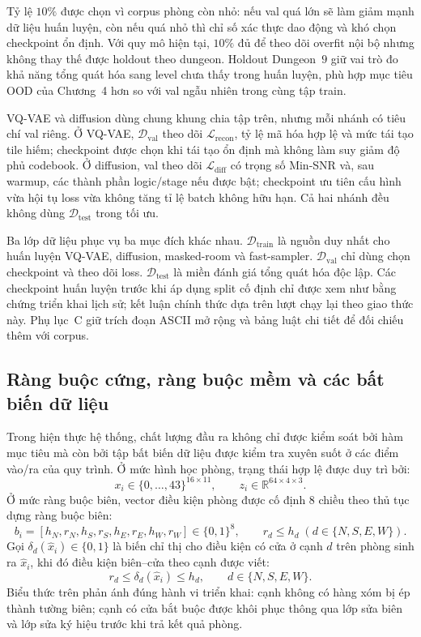 \documentclass[oneside,a4paper,12pt]{extreport}
\begin{document}
Tỷ lệ $10\%$ được chọn vì corpus phòng còn nhỏ: nếu val quá lớn sẽ làm giảm mạnh dữ liệu huấn luyện, còn nếu quá nhỏ thì chỉ số xác thực dao động và khó chọn checkpoint ổn định. Với quy mô hiện tại, $10\%$ đủ để theo dõi overfit nội bộ nhưng không thay thế được holdout theo dungeon. Holdout Dungeon~$9$ giữ vai trò đo khả năng tổng quát hóa sang level chưa thấy trong huấn luyện, phù hợp mục tiêu OOD của Chương~4 hơn so với val ngẫu nhiên trong cùng tập train.

VQ-VAE và diffusion dùng chung khung chia tập trên, nhưng mỗi nhánh có tiêu chí val riêng. Ở VQ-VAE, $\mathcal{D}_{\text{val}}$ theo dõi $\mathcal{L}_{\mathrm{recon}}$, tỷ lệ mã hóa hợp lệ và mức tái tạo tile hiếm; checkpoint được chọn khi tái tạo ổn định mà không làm suy giảm độ phủ codebook. Ở diffusion, val theo dõi $\mathcal{L}_{\mathrm{diff}}$ có trọng số Min-SNR và, sau warmup, các thành phần logic/stage nếu được bật; checkpoint ưu tiên cấu hình vừa hội tụ loss vừa không tăng tỉ lệ batch không hữu hạn. Cả hai nhánh đều không dùng $\mathcal{D}_{\text{test}}$ trong tối ưu.

Ba lớp dữ liệu phục vụ ba mục đích khác nhau. $\mathcal{D}_{\text{train}}$ là nguồn duy nhất cho huấn luyện VQ-VAE, diffusion, masked-room và fast-sampler. $\mathcal{D}_{\text{val}}$ chỉ dùng chọn checkpoint và theo dõi loss. $\mathcal{D}_{\text{test}}$ là miền đánh giá tổng quát hóa độc lập. Các checkpoint huấn luyện trước khi áp dụng split cố định chỉ được xem như bằng chứng triển khai lịch sử; kết luận chính thức dựa trên lượt chạy lại theo giao thức này. Phụ lục~C giữ trích đoạn ASCII mở rộng và bảng luật chi tiết để đối chiếu thêm với corpus.

\subsection{Ràng buộc cứng, ràng buộc mềm và các bất biến dữ liệu}
Trong hiện thực hệ thống, chất lượng đầu ra không chỉ được kiểm soát bởi hàm mục tiêu mà còn bởi tập bất biến dữ liệu được kiểm tra xuyên suốt ở các điểm vào/ra của quy trình. Ở mức hình học phòng, trạng thái hợp lệ được duy trì bởi:
\begin{equation}
x_i \in \{0,\ldots,43\}^{16\times 11},
\qquad
z_i \in \mathbb{R}^{64\times 4\times 3}.
\end{equation}
Ở mức ràng buộc biên, vector điều kiện phòng được cố định 8 chiều theo thủ tục dựng ràng buộc biên:
\begin{equation}
b_i = [h_N,r_N,h_S,r_S,h_E,r_E,h_W,r_W] \in \{0,1\}^8,
\qquad
r_d \le h_d \; (d \in \{N,S,E,W\}).
\end{equation}
Gọi $\delta_d(\hat{x}_i)\in\{0,1\}$ là biến chỉ thị cho điều kiện có cửa ở cạnh $d$ trên phòng sinh ra $\hat{x}_i$, khi đó điều kiện biên--cửa theo cạnh được viết:
\begin{equation}
r_d \le \delta_d(\hat{x}_i) \le h_d,
\qquad d\in\{N,S,E,W\}.
\end{equation}
Biểu thức trên phản ánh đúng hành vi triển khai: cạnh không có hàng xóm bị ép thành tường biên; cạnh có cửa bắt buộc được khôi phục thông qua lớp sửa biên và lớp sửa ký hiệu trước khi trả kết quả phòng.
\end{document}

